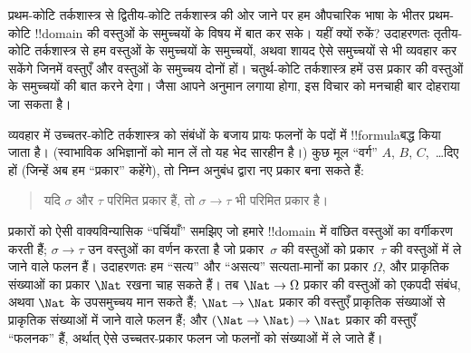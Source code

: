 \documentclass[../../../include/open-logic-section]{subfiles}
\begin{document}


प्रथम-कोटि तर्कशास्त्र से द्वितीय-कोटि तर्कशास्त्र की ओर जाने पर हम
औपचारिक भाषा के भीतर प्रथम-कोटि !!{domain} की वस्तुओं के समुच्चयों के विषय
में बात कर सके। यहीं क्यों रुकें? उदाहरणतः तृतीय-कोटि तर्कशास्त्र से हम
वस्तुओं के समुच्चयों के समुच्चयों, अथवा शायद ऐसे समुच्चयों से भी व्यवहार कर
सकेंगे जिनमें वस्तुएँ और वस्तुओं के समुच्चय दोनों हों। चतुर्थ-कोटि
तर्कशास्त्र हमें उस प्रकार की वस्तुओं के समुच्चयों की बात करने देगा। जैसा
आपने अनुमान लगाया होगा, इस विचार को मनचाही बार दोहराया जा सकता है।

व्यवहार में उच्चतर-कोटि तर्कशास्त्र को संबंधों के बजाय प्रायः फलनों के पदों
में !!{formula}बद्ध किया जाता है। (स्वाभाविक अभिज्ञानों को मान लें तो यह
भेद सारहीन है।) कुछ मूल ``वर्ग'' $A$, $B$, $C$,~\dots दिए हों (जिन्हें अब
हम ``प्रकार'' कहेंगे), तो निम्न अनुबंध द्वारा नए प्रकार बना सकते हैं:
\begin{quote}
यदि $\sigma$ और $\tau$ परिमित प्रकार हैं, तो $\sigma \to \tau$ भी परिमित
प्रकार है।
\end{quote}
प्रकारों को ऐसी वाक्यविन्यासिक ``पर्चियाँ'' समझिए जो हमारे !!{domain} में
वांछित वस्तुओं का वर्गीकरण करती हैं; $\sigma \to \tau$ उन वस्तुओं का वर्णन
करता है जो प्रकार~$\sigma$ की वस्तुओं को प्रकार~$\tau$ की वस्तुओं में ले
जाने वाले फलन हैं। उदाहरणतः हम ``सत्य'' और ``असत्य'' सत्यता-मानों का प्रकार
$\Omega$, और प्राकृतिक संख्याओं का प्रकार $\Nat$ रखना चाह सकते हैं। तब
$\Nat \to
\Omega$ प्रकार की वस्तुओं को एकपदी संबंध, अथवा $\Nat$ के
उपसमुच्चय मान सकते हैं; $\Nat \to \Nat$ प्रकार की वस्तुएँ प्राकृतिक
संख्याओं से प्राकृतिक संख्याओं में जाने वाले फलन हैं; और $(\Nat \to \Nat) \to \Nat$
प्रकार की वस्तुएँ ``फलनक'' हैं, अर्थात् ऐसे उच्चतर-प्रकार फलन जो
फलनों को संख्याओं में ले जाते हैं।
\end{document}
